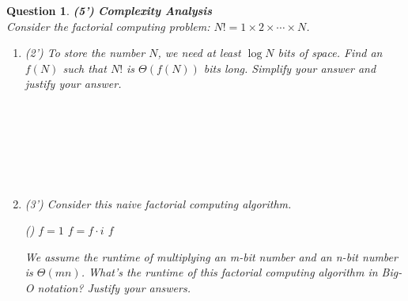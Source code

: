 \documentclass[10.5pt]{article}
\newtheorem{Q}{Question}
\begin{document}
\begin{Q}
\textbf{(5')} \textbf{Complexity Analysis}
\\
Consider the factorial computing problem: $N! = 1 \times 2 \times \cdots \times N $.
\begin{enumerate}
    \item (2') To store the number $N$, we need at least $\log N$ bits of space. Find an $f(N)$ such that $N!$ is $\Theta(f(N))$ bits long. Simplify your answer and justify your answer.
    \\
    \\
    \\
    \\
    \\
    \\
    \\
    \item (3') Consider this naive factorial computing algorithm.
        \algnewcommand{}
        \algnewcommand\RETURN{\State \algorithmicreturn}%
        \algnewcommand{}
        \algnewcommand\PROCEDURE{\item[\algorithmicprocedure]}%
        \algnewcommand{}
        \algnewcommand\ENDPROCEDURE{\item[\algorithmicendprocedure]}%
        \begin{algorithmic}
        \PROCEDURE {}()
        \STATE $f = 1$
        \STATE $f = f \cdot i$
        \ENDFOR
        \RETURN{} $f$
        \ENDPROCEDURE
        \end{algorithmic}
    We assume the runtime of multiplying an m-bit number and an n-bit number is $\Theta(mn)$.
    What's the runtime of this factorial computing algorithm in Big-O notation? Justify your answers.
        

\end{enumerate}

\end{Q}
\end{document}
